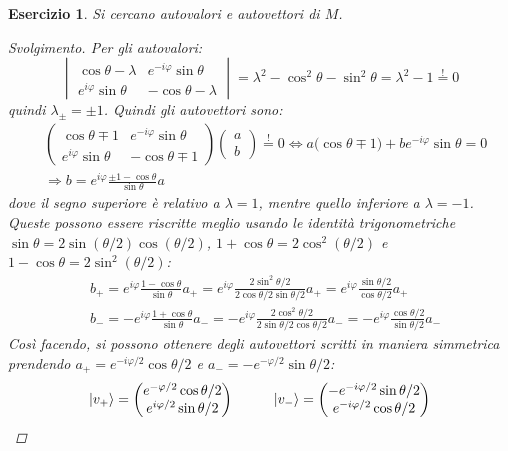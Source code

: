 \documentclass[11pt, a4paper]{scrartcl} %
\numberwithin{equation}{subsection}
\theoremstyle{style2}
\theoremstyle{style1}
\newtheorem{esercizio}{Esercizio}[section]
\renewcommand\qedsymbol{$\blacksquare$}
\newenvironment{svolgimento}{\renewcommand\qedsymbol{$\spadesuit$}\begin{proof}[Svolgimento]}{\end{proof}}
\begin{document}
\begin{esercizio}
	Si cercano autovalori e autovettori di $M$.
	\begin{svolgimento}
		Per gli autovalori:
		\[
			 \begin{vmatrix} \cos \theta  - \lambda  & e^{-i\varphi } \sin \theta  \\ e^{i\varphi } \sin \theta  & - \cos \theta - \lambda  \end{vmatrix} = \lambda ^2 - \cos^2 \theta -\sin^2 \theta = \lambda ^2 - 1 \stackrel{!}{=}0 
		\] 
	quindi $\lambda _{\pm}  = \pm 1 $. 
	Quindi gli autovettori sono:
	\[
		\begin{split}
			&\begin{pmatrix} \cos \theta \mp 1 & e^{-i\varphi } \sin \theta  \\ e^{i\varphi } \sin \theta  & -\cos \theta \mp 1 \end{pmatrix} \begin{pmatrix} a\\ b \end{pmatrix} \stackrel{!}{=}0 \iff a\big(\cos \theta \mp 1\big) + b e^{-i\varphi } \sin \theta  = 0\\
			&\Rightarrow b =e^{i\varphi }  \frac{\pm 1 - \cos \theta }{\sin \theta } a 
		\end{split}
	\] 
	dove il segno superiore \`e relativo a $\lambda = 1$, mentre quello inferiore a $\lambda = - 1$. 
	Queste possono essere riscritte meglio usando le identit\`a trigonometriche $\sin \theta  = 2 \sin (\theta / 2) \cos (\theta / 2)$, $1 + \cos \theta = 2 \cos^2 (\theta / 2)$ e $1 - \cos \theta  = 2 \sin ^2 (\theta / 2)$:
	\[
	\begin{split}
		&b_+ = e^{i\varphi }  \frac{ 1 - \cos \theta }{\sin \theta } a_+ =  e^{i\varphi } \frac{2 \sin ^2 \theta  / 2}{2 \cos \theta  / 2 \sin \theta  / 2}a_+ = e^{i\varphi } \frac{\sin \theta  / 2}{\cos \theta  / 2} a_+\\
		&b_- = - e^{i\varphi } \frac{1+\cos \theta }{\sin \theta }a_- =   -e ^{i\varphi } \frac{2 \cos ^2 \theta / 2}{2 \sin \theta / 2 \cos \theta  /  2}a_- = - e^{i\varphi } \frac{\cos \theta  / 2}{\sin \theta  / 2} a_-
	\end{split}
	\] 
	Cos\`i facendo, si possono ottenere degli autovettori scritti in maniera simmetrica prendendo $a_+ = e^{-i\varphi  / 2} \cos \theta  / 2$ e $a_- = - e^{-\varphi / 2} \sin \theta  / 2$:
	\[
		\ket{v_+} = \begin{pmatrix} e^{-\varphi  / 2} \cos \theta / 2 \\ e^{i \varphi  / 2} \sin \theta  / 2\end{pmatrix} \hspace{1cm} \ket{v_-} = \begin{pmatrix} -e^{- i \varphi  / 2} \sin \theta  / 2 \\ e^{- i\varphi   / 2} \cos \theta  / 2 \end{pmatrix} 
	\] 
	
	\end{svolgimento}
\end{esercizio}
\end{document}
